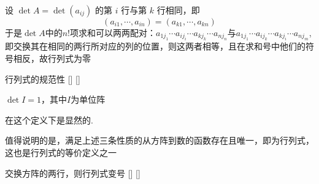 \documentclass[UTF8]{ctexart}
\begin{document}
    \begin{prf}
        设 $\det A = \det(a_{ij})$ 的第 $i$ 行与第 $k$ 行相同，即
    \[(a_{i1}, \cdots, a_{in}) = (a_{k1}, \cdots, a_{kn})\]于是$\det A$中的$n!$项求和可以两两配对：$a_{1j_1} \cdots a_{ij_i} \cdots a_{kj_k} \cdots a_{nj_n}$与$a_{1j_1} \cdots a_{ij_k} \cdots a_{kj_i} \cdots a_{nj_m}$,即交换其在相同的两行所对应的列的位置，则这两者相等，且在求和号中他们的符号相反，故行列式为零
    \end{prf}

    \begin{thm}
			[]
			{行列式的规范性}
			[]
			[]

        $\det I=1$，其中$I$为单位阵
    \end{thm}

    \begin{prf}
        在这个定义下是显然的.
    \end{prf}
    值得说明的是，满足上述三条性质的从方阵到数的函数存在且唯一，即为行列式，这也是行列式的等价定义之一
    \begin{crl}
			[]
			{交换方阵的两行，则行列式变号}
			[]
			[]

    \end{crl}
\end{document}
